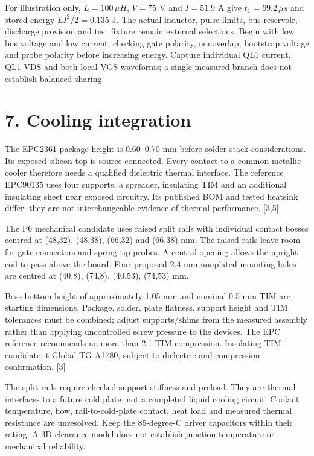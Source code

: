 \documentclass[10pt,a4paper]{article}
\begin{document}
For illustration only, $L=100\,\mu H$, $V=75$ V and $I=51.9$ A give $t_1=69.2\,\mu s$ and stored energy $LI^2/2=0.135$ J. The actual inductor, pulse limits, bus reservoir, discharge provision and test fixture remain external selections. Begin with low bus voltage and low current, checking gate polarity, nonoverlap, bootstrap voltage and probe polarity before increasing energy. Capture individual QL1 current, QL1 VDS and both local VGS waveforms; a single measured branch does not establish balanced sharing.
\newpage
\section*{7. Cooling integration}
The EPC2361 package height is 0.60--0.70 mm before solder-stack considerations. Its exposed silicon top is source connected. Every contact to a common metallic cooler therefore needs a qualified dielectric thermal interface. The reference EPC90135 uses four supports, a spreader, insulating TIM and an additional insulating sheet near exposed circuitry. Its published BOM and tested heatsink differ; they are not interchangeable evidence of thermal performance. [3,5]

The P6 mechanical candidate uses raised split rails with individual contact bosses centred at (48,32), (48,38), (66,32) and (66,38) mm. The raised rails leave room for gate connectors and spring-tip probes. A central opening allows the upright coil to pass above the board. Four proposed 2.4 mm nonplated mounting holes are centred at (40,8), (74,8), (40,53), (74,53) mm.

Boss-bottom height of approximately 1.05 mm and nominal 0.5 mm TIM are starting dimensions. Package, solder, plate flatness, support height and TIM tolerances must be combined; adjust supports/shims from the measured assembly rather than applying uncontrolled screw pressure to the devices. The EPC reference recommends no more than 2:1 TIM compression. Insulating TIM candidate: t-Global TG-A1780, subject to dielectric and compression confirmation. [3]

The split rails require checked support stiffness and preload. They are thermal interfaces to a future cold plate, not a completed liquid cooling circuit. Coolant temperature, flow, rail-to-cold-plate contact, heat load and measured thermal resistance are unresolved. Keep the 85-degree-C driver capacitors within their rating. A 3D clearance model does not establish junction temperature or mechanical reliability.
\end{document}
